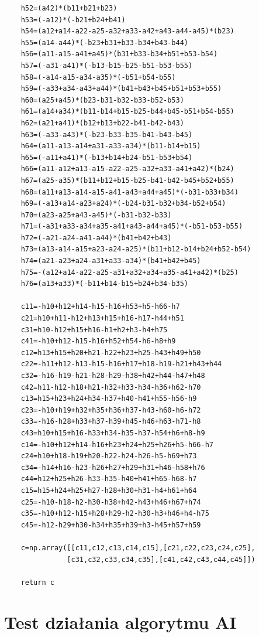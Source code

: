 \documentclass{article}
\begin{document}
\begin{verbatim}
    h52=(a42)*(b11+b21+b23)
    h53=(-a12)*(-b21+b24+b41)
    h54=(a12+a14-a22-a25-a32+a33-a42+a43-a44-a45)*(b23)
    h55=(a14-a44)*(-b23+b31+b33-b34+b43-b44)
    h56=(a11-a15-a41+a45)*(b31+b33-b34+b51+b53-b54)
    h57=(-a31-a41)*(-b13-b15-b25-b51-b53-b55)
    h58=(-a14-a15-a34-a35)*(-b51+b54-b55)
    h59=(-a33+a34-a43+a44)*(b41+b43+b45+b51+b53+b55)
    h60=(a25+a45)*(b23-b31-b32-b33-b52-b53)
    h61=(a14+a34)*(b11-b14+b15-b25-b44+b45-b51+b54-b55)
    h62=(a21+a41)*(b12+b13+b22-b41-b42-b43)
    h63=(-a33-a43)*(-b23-b33-b35-b41-b43-b45)
    h64=(a11-a13-a14+a31-a33-a34)*(b11-b14+b15)
    h65=(-a11+a41)*(-b13+b14+b24-b51-b53+b54)
    h66=(a11-a12+a13-a15-a22-a25-a32+a33-a41+a42)*(b24)
    h67=(a25-a35)*(b11+b12+b15-b25-b41-b42-b45+b52+b55)
    h68=(a11+a13-a14-a15-a41-a43+a44+a45)*(-b31-b33+b34)
    h69=(-a13+a14-a23+a24)*(-b24-b31-b32+b34-b52+b54)
    h70=(a23-a25+a43-a45)*(-b31-b32-b33)
    h71=(-a31+a33-a34+a35-a41+a43-a44+a45)*(-b51-b53-b55)
    h72=(-a21-a24-a41-a44)*(b41+b42+b43)
    h73=(a13-a14-a15+a23-a24-a25)*(b11+b12-b14+b24+b52-b54)
    h74=(a21-a23+a24-a31+a33-a34)*(b41+b42+b45)
    h75=-(a12+a14-a22-a25-a31+a32+a34+a35-a41+a42)*(b25)
    h76=(a13+a33)*(-b11+b14-b15+b24+b34-b35)

    c11=-h10+h12+h14-h15-h16+h53+h5-h66-h7
    c21=h10+h11-h12+h13+h15+h16-h17-h44+h51
    c31=h10-h12+h15+h16-h1+h2+h3-h4+h75
    c41=-h10+h12-h15-h16+h52+h54-h6-h8+h9
    c12=h13+h15+h20+h21-h22+h23+h25-h43+h49+h50
    c22=-h11+h12-h13-h15-h16+h17+h18-h19-h21+h43+h44
    c32=-h16-h19-h21-h28-h29-h38+h42+h44-h47+h48
    c42=h11-h12-h18+h21-h32+h33-h34-h36+h62-h70
    c13=h15+h23+h24+h34-h37+h40-h41+h55-h56-h9
    c23=-h10+h19+h32+h35+h36+h37-h43-h60-h6-h72
    c33=-h16-h28+h33+h37-h39+h45-h46+h63-h71-h8
    c43=h10+h15+h16-h33+h34-h35-h37-h54+h6+h8-h9
    c14=-h10+h12+h14-h16+h23+h24+h25+h26+h5-h66-h7
    c24=h10+h18-h19+h20-h22-h24-h26-h5-h69+h73
    c34=-h14+h16-h23-h26+h27+h29+h31+h46-h58+h76
    c44=h12+h25+h26-h33-h35-h40+h41+h65-h68-h7
    c15=h15+h24+h25+h27-h28+h30+h31-h4+h61+h64
    c25=-h10-h18-h2-h30-h38+h42-h43+h46+h67+h74
    c35=-h10+h12-h15+h28+h29-h2-h30-h3+h46+h4-h75
    c45=-h12-h29+h30-h34+h35+h39+h3-h45+h57+h59

    c=np.array([[c11,c12,c13,c14,c15],[c21,c22,c23,c24,c25],
               [c31,c32,c33,c34,c35],[c41,c42,c43,c44,c45]])
    
    return c
\end{verbatim}

\section{Test działania algorytmu AI}
\end{document}
